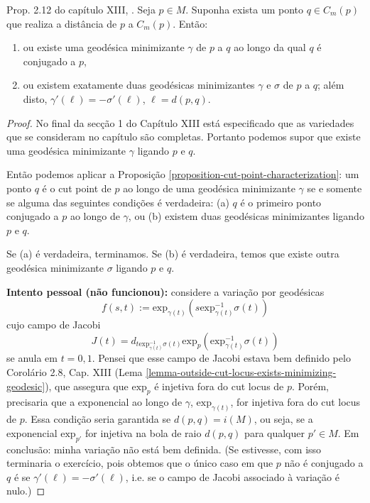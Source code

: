 \begin{exercise}
\label{exercise-l8-1}
Prop. 2.12 do capítulo XIII, \cite{doc}. Seja $p \in M$. 
Suponha exista um ponto $q \in C_m(p)$ que realiza a distância de $p$ a 
$C_m(p)$. Então:
\begin{enumerate}
\item ou existe uma geodésica 
minimizante $\gamma$ de $p$ a $q$ ao longo da qual $q$ é 
conjugado a $p$,
\item ou existem exatamente duas geodésicas 
minimizantes $\gamma$ e $\sigma$ de $p$ a $q$; além disto,
$\gamma'(\ell)=-\sigma'(\ell)$, 
$\ell=d(p,q)$. 
\end{enumerate}
\end{exercise}

\begin{proof}
No final da secção 1 do Capítulo XIII está especificado que as variedades que se
consideram no capítulo são completas. Portanto podemos supor que existe
uma geodésica minimizante $\gamma$ ligando $p$ e $q$.

Então podemos aplicar a Proposição \ref{proposition-cut-point-characterization}:
 um ponto $q$ é o cut point de $p$ ao longo de uma 
geodésica minimizante $\gamma$ se e somente se
alguma das seguintes condições é verdadeira: 
(a) $q$ é o primeiro ponto conjugado a $p$ ao longo de $\gamma$, ou 
(b) existem duas geodésicas minimizantes ligando $p$ e $q$.

Se (a) é verdadeira, terminamos. Se (b) é verdadeira, temos que existe outra
geodésica minimizante $\sigma$ ligando $p$ e $q$.

{\bf Intento pessoal (não funcionou):}  considere a variação por geodésicas 
$$
f(s,t):=\text{exp}_{\gamma(t)}
(s\text{exp}_{\gamma(t)}^{-1}\sigma(t))
$$
cujo campo de Jacobi 
$$
J(t)=d_{t\text{exp}_{\gamma(t)}^{-1}\sigma(t)}
\text{exp}_p(\text{exp}_{\gamma(t)}^{-1}\sigma(t))
$$
se anula em $t=0,1$. Pensei que esse campo de Jacobi estava bem definido pelo 
Corolário 2.8, Cap. XIII (Lema 
\ref{lemma-outside-cut-locus-exists-minimizing-geodesic}), que assegura
 que $\text{exp}_p$ é injetiva fora do cut locus de $p$. Porém, precisaria
 que a exponencial ao longo de $\gamma$,
 $\text{exp}_{\gamma(t)}$, for injetiva fora do cut locus de $p$. 
Essa condição seria garantida se $d(p,q)=i(M)$, ou seja, se a exponencial
 $\text{exp}_{p'}$ for injetiva na bola de raio $d(p,q)$ para qualquer 
$p' \in M$. Em conclusão: minha variação não está bem definida. 
(Se estivesse, com
isso terminaria o exercício, pois obtemos que o único caso em que $p$ não é
conjugado a $q$ é se $\gamma'(\ell)=-\sigma'(\ell)$, i.e. se o campo de Jacobi 
associado à variação é nulo.) 


\end{proof}
